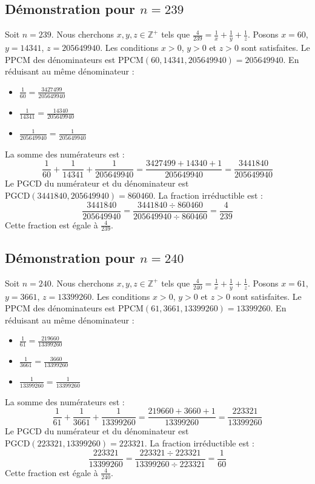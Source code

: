 \documentclass[11pt,a4paper]{article}
\begin{document}
\subsection{Démonstration pour $n = 239$}
Soit $n = 239$. Nous cherchons $x, y, z \in \mathbb{Z}^{+}$ tels que $\frac{4}{239} = \frac{1}{x} + \frac{1}{y} + \frac{1}{z}$.
Posons $x = 60$, $y = 14341$, $z = 205649940$.
Les conditions $x > 0$, $y > 0$ et $z > 0$ sont satisfaites.
Le PPCM des dénominateurs est $\text{PPCM}(60, 14341, 205649940) = 205649940$.
En réduisant au même dénominateur :
\begin{itemize}
    \item $\frac{1}{60} = \frac{3427499}{205649940}$
    \item $\frac{1}{14341} = \frac{14340}{205649940}$
    \item $\frac{1}{205649940} = \frac{1}{205649940}$
\end{itemize}
La somme des numérateurs est :
$$ \frac{1}{60} + \frac{1}{14341} + \frac{1}{205649940} = \frac{3427499 + 14340 + 1}{205649940} = \frac{3441840}{205649940} $$
Le PGCD du numérateur et du dénominateur est $\text{PGCD}(3441840, 205649940) = 860460$.
La fraction irréductible est :
$$ \frac{3441840}{205649940} = \frac{3441840 \div 860460}{205649940 \div 860460} = \frac{4}{239} $$
Cette fraction est égale à $\frac{4}{239}$.

\subsection{Démonstration pour $n = 240$}
Soit $n = 240$. Nous cherchons $x, y, z \in \mathbb{Z}^{+}$ tels que $\frac{4}{240} = \frac{1}{x} + \frac{1}{y} + \frac{1}{z}$.
Posons $x = 61$, $y = 3661$, $z = 13399260$.
Les conditions $x > 0$, $y > 0$ et $z > 0$ sont satisfaites.
Le PPCM des dénominateurs est $\text{PPCM}(61, 3661, 13399260) = 13399260$.
En réduisant au même dénominateur :
\begin{itemize}
    \item $\frac{1}{61} = \frac{219660}{13399260}$
    \item $\frac{1}{3661} = \frac{3660}{13399260}$
    \item $\frac{1}{13399260} = \frac{1}{13399260}$
\end{itemize}
La somme des numérateurs est :
$$ \frac{1}{61} + \frac{1}{3661} + \frac{1}{13399260} = \frac{219660 + 3660 + 1}{13399260} = \frac{223321}{13399260} $$
Le PGCD du numérateur et du dénominateur est $\text{PGCD}(223321, 13399260) = 223321$.
La fraction irréductible est :
$$ \frac{223321}{13399260} = \frac{223321 \div 223321}{13399260 \div 223321} = \frac{1}{60} $$
Cette fraction est égale à $\frac{4}{240}$.
\end{document}
